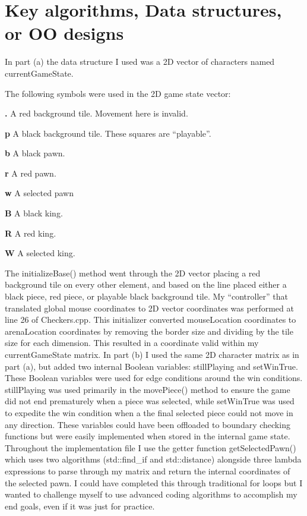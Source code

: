 \documentclass[12pt]{article}
\begin{document}
\section[2]{Key algorithms, Data structures, or OO designs}
\hfill\begin{minipage}{\dimexpr\textwidth-1cm}
In part (a) the data structure I used was a 2D vector of characters named currentGameState.
\begin{description}
\item The following symbols were used in the 2D game state vector:
\item \textbf{.} A red background tile. Movement here is invalid.
\item \textbf{p} A black background tile. These squares are “playable”.
\item \textbf{b} A black pawn.
\item \textbf{r} A red pawn.
\item \textbf{w} A selected pawn
\item \textbf{B} A black king.
\item \textbf{R} A red king.
\item \textbf{W} A selected king.
\end{description}
The initializeBase() method went through the 2D vector placing a red background tile on every other element, and based on the line placed either a black piece, red piece, or playable black background tile. \newline
My “controller” that translated global mouse coordinates to 2D vector coordinates was performed at line 26 of Checkers.cpp. This initializer converted mouseLocation coordinates to arenaLocation coordinates by removing the border size and dividing by the tile size for each dimension. This resulted in a coordinate valid within my currentGameState matrix. \newline
\newline
In part (b) I used the same 2D character matrix as in part (a), but added two internal Boolean variables: stillPlaying and setWinTrue. These Boolean variables were used for edge conditions around the win conditions. stillPlaying was used primarily in the movePiece() method to ensure the game did not end prematurely when a piece was selected, while setWinTrue was used to expedite the win condition when a the final selected piece could not move in any direction. These variables could have been offloaded to boundary checking functions but were easily implemented when stored in the internal game state. \newline
Throughout the implementation file I use the getter function getSelectedPawn() which uses two algorithms (std::find\_if and std::distance) alongside three lambda expressions to parse through my matrix and return the internal coordinates of the selected pawn. I could have completed this through traditional for loops but I wanted to challenge myself to use advanced coding algorithms to accomplish my end goals, even if it was just for practice. 
\end{minipage}
\end{document}
